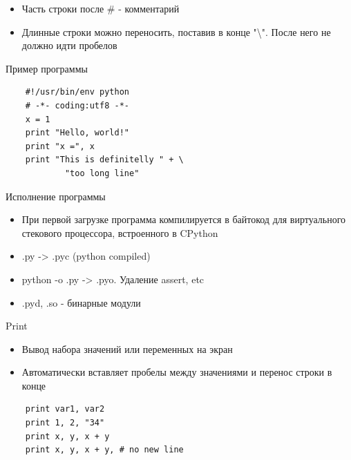 \documentclass{article}
\begin{document}
\begin{itemize}
    \item Часть строки после \# - комментарий
    \item Длинные строки можно переносить, поставив в конце 
    		"\textbackslash". После него не должно идти пробелов
\end{itemize}
\newpage

\begin{center} Пример программы \end{center}
\vspace{15pt}
\begin{lstlisting}
    #!/usr/bin/env python
    # -*- coding:utf8 -*-
    x = 1
    print "Hello, world!"
    print "x =", x
    print "This is definitelly " + \
            "too long line"
\end{lstlisting}
\newpage

\begin{center} Исполнение программы \end{center}
\begin{itemize}
    \item При первой загрузке программа компилируется в байтокод для 
    	виртуального стекового процессора, встроенного в CPython
    \item .py -> .pyc (python compiled)
    \item python -o  .py -> .pyo. Удаление assert, etc
    \item .pyd, .so - бинарные модули
\end{itemize}
\newpage

\begin{center} Print \end{center}
\begin{itemize}
    \item Вывод набора значений или переменных на экран
    \item Автоматически вставляет пробелы между значениями и перенос строки в конце
\end{itemize}
\vspace{15pt}
\begin{lstlisting}
    print var1, var2
    print 1, 2, "34"
    print x, y, x + y
    print x, y, x + y, # no new line
\end{lstlisting}
\newpage
\end{document}
